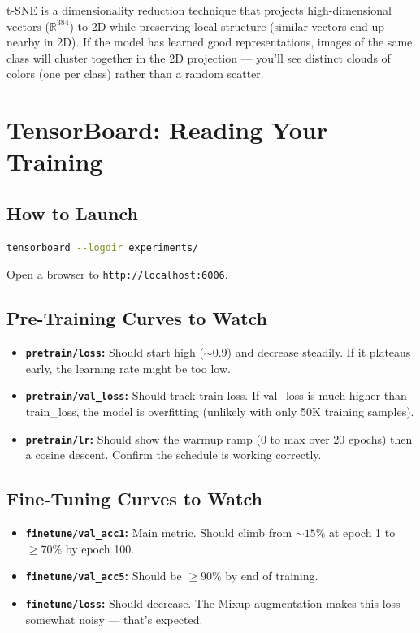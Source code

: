 \documentclass[12pt, a4paper]{report}
\newcommand{\R}{\mathbb{R}}
\begin{document}
t-SNE is a dimensionality reduction technique that projects high-dimensional vectors ($\R^{384}$) to 2D while preserving local structure (similar vectors end up nearby in 2D). If the model has learned good representations, images of the same class will cluster together in the 2D projection — you'll see distinct clouds of colors (one per class) rather than a random scatter.

\chapter{TensorBoard: Reading Your Training}

\section{How to Launch}

\begin{lstlisting}[language=bash]
tensorboard --logdir experiments/
\end{lstlisting}

Open a browser to \texttt{http://localhost:6006}.

\section{Pre-Training Curves to Watch}

\begin{itemize}
    \item \textbf{\texttt{pretrain/loss}:} Should start high ($\sim 0.9$) and decrease steadily. If it plateaus early, the learning rate might be too low.
    \item \textbf{\texttt{pretrain/val\_loss}:} Should track train loss. If val\_loss is much higher than train\_loss, the model is overfitting (unlikely with only 50K training samples).
    \item \textbf{\texttt{pretrain/lr}:} Should show the warmup ramp (0 to max over 20 epochs) then a cosine descent. Confirm the schedule is working correctly.
\end{itemize}

\section{Fine-Tuning Curves to Watch}

\begin{itemize}
    \item \textbf{\texttt{finetune/val\_acc1}:} Main metric. Should climb from $\sim 15\%$ at epoch 1 to $\geq 70\%$ by epoch 100.
    \item \textbf{\texttt{finetune/val\_acc5}:} Should be $\geq 90\%$ by end of training.
    \item \textbf{\texttt{finetune/loss}:} Should decrease. The Mixup augmentation makes this loss somewhat noisy — that's expected.
\end{itemize}
\end{document}
